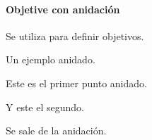 \paragraph{Objetive con anidación}

Se utiliza para definir objetivos.

\begin{objetive}
	\item Un ejemplo anidado.
	\begin{objetive}
		\item Este es el primer punto anidado.
		\item Y este el segundo.
	\end{objetive}
	\item Se sale de la anidación.
\end{objetive}